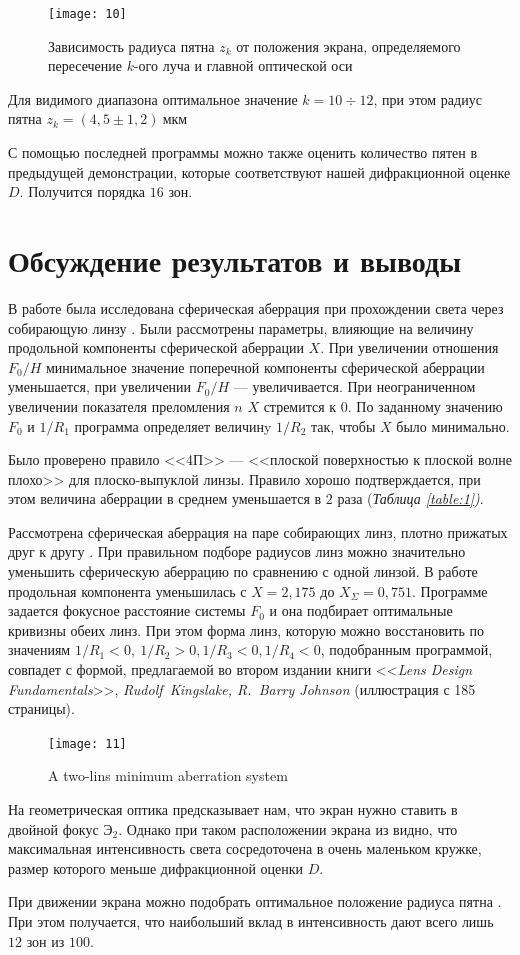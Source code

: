 \documentclass[a4paper, 12pt]{article}
\begin{document}
\begin{figure}[H]
    \texttt{[image: 10]} 
    \caption{Зависимость радиуса пятна $z_k$ от положения экрана,
    определяемого пересечение $k$-ого луча и главной оптической оси}
    \label{fig:10}
\end{figure}

Для видимого диапазона оптимальное значение $k = 10\div 12$, при этом
радиус пятна $z_k = (4,5 \pm 1,2)\ \text{мкм}$

С помощью последней программы можно также оценить
количество пятен в предыдущей демонстрации, которые соответствуют
нашей
дифракционной оценке $D$. Получится порядка $16$ зон.

\section{Обсуждение результатов и выводы}
В работе была исследована сферическая аберрация при прохождении света
через собирающую линзу . Были рассмотрены
параметры, влияющие на величину продольной компоненты сферической
аберрации $X$. При увеличении отношения $F_0/H$ минимальное значение
поперечной компоненты сферической аберрации уменьшается, при
увеличении $F_0/H$ --- увеличивается. При неограниченном увеличении
показателя преломления $n$ $X$ стремится к $0$. По заданному значению
$F_0$ и $1/R_1$ программа определяет величинy $1/R_2$ так, чтобы $X$ было
минимально.

Было проверено правило <<4П>> --- <<плоской поверхностью к плоской
волне плохо>> для плоско-выпуклой линзы. Правило хорошо подтверждается,
при этом величина аберрации в среднем уменьшается в $2$ раза (\textsl{Таблица
\ref{table:1})}.

Рассмотрена сферическая аберрация на паре собирающих линз, плотно
прижатых друг к другу . При правильном подборе радиусов
линз можно значительно уменьшить сферическую аберрацию по сравнению с
одной линзой. В работе продольная компонента уменьшилась с $X=2,175$
до $X_\Sigma = 0,751$. Программе задается фокусное расстояние системы
$F_0$ и она подбирает
оптимальные кривизны обеих линз. При этом форма линз, которую можно
восстановить по значениям $1/R_1<0 ,\ 1/R_2>0, 1/R_3<0, 1/R_4<0$, подобранным
программой, совпадет с формой, предлагаемой во втором издании книги
<<\textit{Lens Design Fundamentals}>>, \textit{Rudolf~Kingslake,
R.~Barry Johnson} (иллюстрация с 185 страницы).

\begin{figure}[H]
    \texttt{[image: 11]} 
    \caption{A two-lins minimum aberration system}
    \label{fig:11}
\end{figure}


На  геометрическая оптика предсказывает нам, что экран
нужно ставить в двойной фокус $\text{Э}_2$. Однако при таком
расположении экрана из  видно, что максимальная
интенсивность света сосредоточена в очень маленьком кружке, 
размер которого меньше дифракционной оценки $D$.

При движении экрана можно подобрать оптимальное положение радиуса
пятна . При этом получается, что наибольший вклад в
интенсивность дают всего лишь $12$ зон из $100$. 
\end{document}
